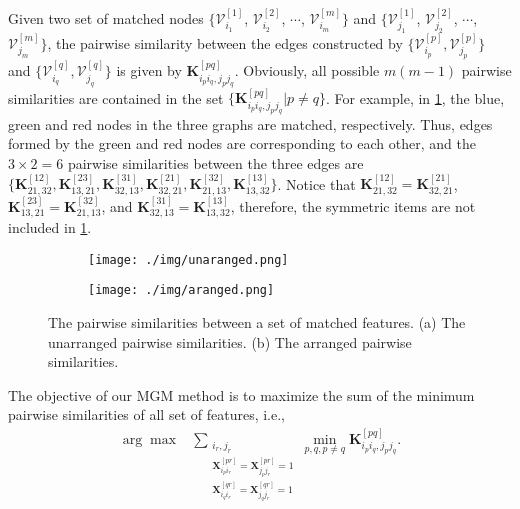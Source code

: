 Given two set of matched nodes $\{\mathcal V^{[1]}_{i_1}$, $\mathcal V^{[2]}_{i_2}$, $\cdots$, $\mathcal V^{[m]}_{i_m}\}$ and $\{\mathcal V^{[1]}_{j_1}$, $\mathcal V^{[2]}_{j_2}$, $\cdots$, $\mathcal V^{[m]}_{j_m}\}$, the pairwise similarity between the edges constructed by $\{\mathcal V^{[p]}_{i_p}, \mathcal V^{[p]}_{j_p}\}$ and $\{\mathcal V^{[q]}_{i_q}, \mathcal V^{[q]}_{j_q}\}$ is given by $\mathbf K^{[pq]}_{i_p i_q,j_p j_q}$. Obviously, all possible $m(m-1)$ pairwise similarities are contained in the set $\{\mathbf K^{[pq]}_{i_p i_q,j_p j_q}| p \neq q\}$. For example, in \cref{fig:4.1}, the blue, green and red nodes in the three graphs are matched, respectively. Thus, edges formed by the green and red nodes are corresponding to each other, and the $3\times 2 = 6$ pairwise similarities between the three edges are $\{\mathbf K^{[12]}_{21, 32}, \mathbf K^{[23]}_{13, 21}, \mathbf K^{[31]}_{32, 13}, \mathbf K^{[21]}_{32, 21}, \mathbf K^{[32]}_{21, 13}, \mathbf K^{[13]}_{13, 32}\}$. Notice that $\mathbf K^{[12]}_{21, 32} =  \mathbf K^{[21]}_{32, 21}$, $\mathbf K^{[23]}_{13, 21} = \mathbf K^{[32]}_{21, 13}$, and $\mathbf K^{[31]}_{32, 13} = \mathbf K^{[13]}_{13, 32}$, therefore, the symmetric items are not included in \cref{fig:4.1}.
\begin{figure}[htb!]
    \centering
    \begin{subfigure}{.28\textwidth}
        \centering
        \texttt{[image: ./img/unaranged.png]}
        \caption{}
        \label{fig:4.1}
    \end{subfigure}
    \begin{subfigure}{.34\textwidth}
        \centering
        \texttt{[image: ./img/aranged.png]}
        \caption{}
        \label{fig:4.2}
    \end{subfigure}
    \caption{The pairwise similarities between a set of matched features. (a) The unarranged pairwise similarities. (b) The arranged pairwise similarities.}
\end{figure}

The objective of our MGM method is to maximize the sum of the minimum pairwise similarities of all set of features, i.e.,
\begin{equation}
    \begin{split}
        \arg\max & \sum_{\substack{i_r,j_r \\ \mathbf X^{[pr]}_{i_pi_r} = \mathbf X^{[pr]}_{j_pj_r} = 1 \\ \mathbf X^{[qr]}_{i_qi_r} = \mathbf X^{[qr]}_{j_qj_r} = 1}} \min_{p, q, p \neq q} \mathbf K^{[pq]}_{i_pi_q, j_pj_q}.
    \end{split}
    \label{eq:unarraged_obj}
\end{equation}


